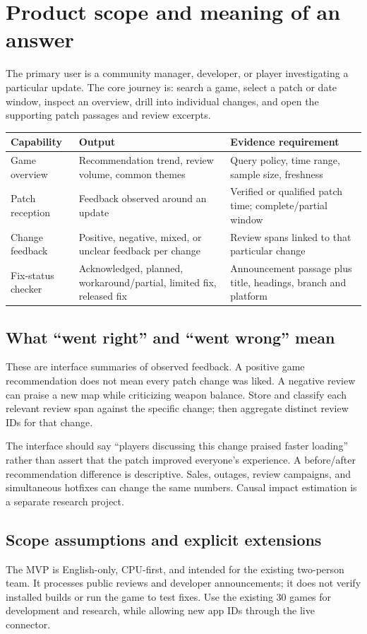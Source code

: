 \documentclass[10pt,letterpaper]{article}
\newcommand{\nextsection}[1]{\clearpage\section{#1}}
\begin{document}
\clearpage
\begingroup
\setlength{\parskip}{0pt}
\small\tableofcontents
\endgroup

\nextsection{Product scope and meaning of an answer}
The primary user is a community manager, developer, or player investigating a particular update. The core journey is: search a game, select a patch or date window, inspect an overview, drill into individual changes, and open the supporting patch passages and review excerpts.

\begin{tabularx}{\linewidth}{p{1.25in}YY}
\toprule
Capability & Output & Evidence requirement \\
\midrule
Game overview & Recommendation trend, review volume, common themes & Query policy, time range, sample size, freshness \\
Patch reception & Feedback observed around an update & Verified or qualified patch time; complete/partial window \\
Change feedback & Positive, negative, mixed, or unclear feedback per change & Review spans linked to that particular change \\
Fix-status checker & Acknowledged, planned, workaround/partial, limited fix, released fix & Announcement passage plus title, headings, branch and platform \\
\bottomrule
\end{tabularx}

\subsection{What ``went right'' and ``went wrong'' mean}
These are interface summaries of observed feedback. A positive game recommendation does not mean every patch change was liked. A negative review can praise a new map while criticizing weapon balance. Store and classify each relevant review span against the specific change; then aggregate distinct review IDs for that change.

The interface should say ``players discussing this change praised faster loading'' rather than assert that the patch improved everyone's experience. A before/after recommendation difference is descriptive. Sales, outages, review campaigns, and simultaneous hotfixes can change the same numbers. Causal impact estimation is a separate research project.

\subsection{Scope assumptions and explicit extensions}
The MVP is English-only, CPU-first, and intended for the existing two-person team. It processes public reviews and developer announcements; it does not verify installed builds or run the game to test fixes. Use the existing 30 games for development and research, while allowing new app IDs through the live connector.
\end{document}
